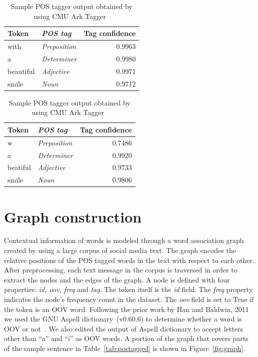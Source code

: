 \documentclass[a4paper,onesided,12pt]{report}
\begin{document}
\begin{table}[htbp]
\caption{Sample POS tagger output obtained by using CMU Ark Tagger~\cite{owoputi2013improved,Gimpel:2011:PTT:2002736.2002747}}
\begin{minipage}{.5\linewidth}
\begin{tabular}[h]{|l>{\itshape}lr|}
 \hline
Token & POS tag & Tag confidence \\
 \hline
with & Preposition & 0.9963 \\
 \hline
a & Determiner & 0.9980 \\
 \hline
beautiful & Adjective & 0.9971 \\
 \hline
smile & Noun & 0.9712 \\
 \hline
\end{tabular}
\end{minipage}
\begin{minipage}{.5\linewidth}
\begin{tabular}[h]{|l>{\itshape}lr|}
 \hline
Token & POS tag & Tag confidence \\
 \hline
w & Preposition & 0.7486 \\
 \hline
a & Determiner & 0.9920 \\
 \hline
beatiful & Adjective & 0.9733 \\
 \hline
smile & Noun & 0.9806 \\
 \hline
\end{tabular}
\end{minipage}
\label{tab:postags}
\end{table}

\section{Graph construction}

Contextual information of words is modeled through a word association graph created by using a large corpus of social media text. The graph encodes the relative positions of the POS tagged words in the text with respect to each other. After preprocessing, each text message in the corpus is traversed in order to extract the nodes and the edges of the graph.
A node is defined with four properties: \textit{id, oov, freq} and \textit{tag}. The token itself is the \textit{id} field. The \textit{freq} property indicates the node's frequency count in the dataset. The \textit{oov} field is set to True if the token is an OOV word. Following the prior work by Han and Baldwin, 2011 we used the GNU Aspell dictionary~(v0.60.6) to determine whether a word is OOV or not~\cite{Han:2011:LNS:2002472.2002520}. We also edited the output of Aspell dictionary to accept letters other than ``a'' and ``i'' as OOV words. A portion of the graph that covers parts of the sample sentence in Table~\ref{tab:postagged} is shown in Figure~\ref{fig:graph}.
\end{document}
